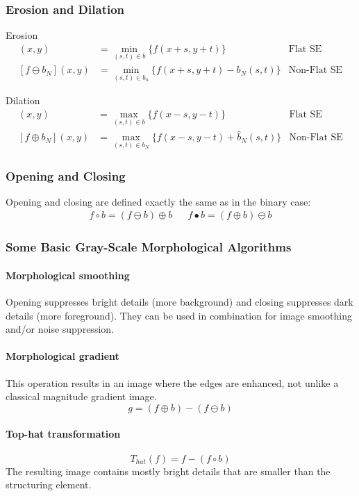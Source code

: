 \subsubsection{Erosion and Dilation}
Erosion
\begin{align*}
	[f\ominus b](x,y)	&= \min_{(s,t)\in b} \{f(x+s,y+t)\}				& \text{Flat SE} \\
	[f\ominus b_N](x,y)	&= \min_{(s,t)\in b_n} \{f(x+s,y+t) -b_N(s,t)\}	& \text{Non-Flat SE}
\end{align*}

Dilation
\begin{align*}
	[f\oplus b](x,y)	&= \max_{(s,t)\in b} \{f(x-s,y-t)\}				& \text{Flat SE} \\
	[f\oplus b_N](x,y)	&= \max_{(s,t)\in b_N} \{f(x-s,y-t) + \hat{b}_N(s,t)\}	& \text{Non-Flat SE}
\end{align*}

\subsubsection{Opening and Closing}
Opening and closing are defined exactly the same as in the binary case:
\begin{align*}
	f \circ b = (f \ominus b) \oplus b &&
	f  \bullet b = (f \oplus b) \ominus b
\end{align*}

\subsubsection{Some Basic Gray-Scale Morphological Algorithms}
\paragraph{Morphological smoothing}
Opening suppresses bright details (more background) and closing suppresses dark details (more foreground). They can be used in combination for image smoothing and/or noise suppression.
\paragraph{Morphological gradient}
This operation results in an image where the edges are enhanced, not unlike a classical magnitude gradient image.
\[
	g=(f\oplus b)-(f\ominus b)
\]
\paragraph{Top-hat transformation}
\[
	T_{hat}(f) = f -(f \circ b)
\]
The resulting image contains mostly bright details that are smaller than the structuring element.
